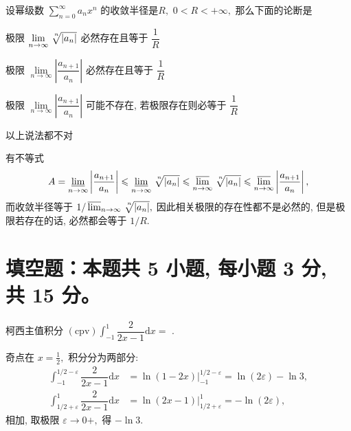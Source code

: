 \begin{question}
设幂级数 $\sum\limits_{n=0}^\infty a_n x^n$ 的收敛半径是$R,$ $0 < R < +\infty,$ 那么下面的论断是 \paren[C]

\begin{choices}
\item 极限 $\lim\limits_{n\to\infty} \nroot[n]{\lvert a_n \rvert}$ 必然存在且等于 $\dfrac{1}{R}$
\item 极限 $\lim\limits_{n\to\infty} \left\lvert \dfrac{a_{n+1}}{a_n} \right\rvert$ 必然存在且等于 $\dfrac{1}{R}$
\item 极限 $\lim\limits_{n\to\infty} \left\lvert \dfrac{a_{n+1}}{a_n} \right\rvert$ 可能不存在, 若极限存在则必等于 $\dfrac{1}{R}$
\item 以上说法都不对
\end{choices}
\end{question}

\begin{solution}
有不等式
\[A = \varliminf_{n\to\infty} \left\lvert \dfrac{a_{n+1}}{a_n} \right\rvert \leqslant \varliminf_{n\to\infty} \nroot[n]{\lvert a_n \rvert} \leqslant \varlimsup_{n\to\infty} \nroot[n]{\lvert a_n \rvert} \leqslant \varlimsup_{n\to\infty}  \left\lvert \dfrac{a_{n+1}}{a_n} \right\rvert,\]
而收敛半径等于 $1 / \varlimsup_{n\to\infty} \nroot[n]{\lvert a_n \rvert},$ 因此相关极限的存在性都不是必然的, 但是极限若存在的话, 必然都会等于 $1 / R.$
\end{solution}


\section{填空题：本题共 5 小题, 每小题 3 分, 共 15 分。}



\begin{question}
柯西主值积分 $\displaystyle (\text{cpv}) \int_{-1}^1 \dfrac{2}{2x-1} \mathrm{d}x =$ \fillin[$-\ln 3$].
\end{question}

\begin{solution}
奇点在 $x = \frac{1}{2},$ 积分分为两部分:
\begin{align*}
\int_{-1}^{1/2 - \varepsilon} \dfrac{2}{2x-1} \mathrm{d}x & = \ln (1 - 2x) \bigg|_{-1}^{1/2 - \varepsilon} = \ln(2\varepsilon) - \ln 3, \\
\int_{1/2 + \varepsilon}^1 \dfrac{2}{2x-1} \mathrm{d}x & = \ln (2x - 1) \bigg|_{1/2 + \varepsilon}^1 = -\ln(2\varepsilon),
\end{align*}
相加, 取极限 $\varepsilon \to 0+,$ 得 $-\ln 3.$
\end{solution}

